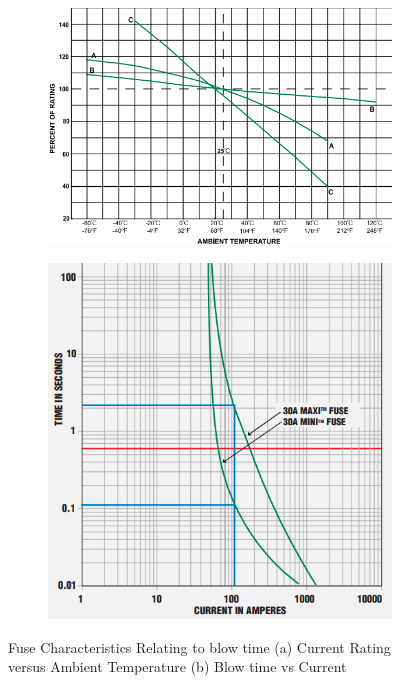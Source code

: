  \begin{figure}[!htb]
 \footnotesize
 \centering
    \begin{subfigure}[]{0.42\textwidth}
              \centering
  		\includegraphics[width=1\linewidth]{./Figures/temperature.png}
		    \caption{} \label{subfig:temp}
     \end{subfigure}
     \begin{subfigure}[]{0.3\textwidth}
             \centering
  		\includegraphics[width=1\linewidth]{./Figures/c-t.png}
		   \caption{ } \label{subfig:c-t}
     \end{subfigure}
   \caption[{Fuse Characteristics}]{Fuse Characteristics Relating to blow time   (a)  Current Rating versus Ambient Temperature\cite{LF} (b)  Blow time vs Current \cite{LF2} }
    \label{fig:two}
 \end{figure}


